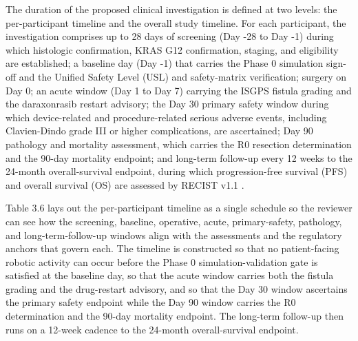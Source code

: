 The duration of the proposed clinical investigation is defined at two levels: the
per-participant timeline and the overall study timeline. For each participant, the
investigation comprises up to 28 days of screening (Day -28 to Day -1) during which
histologic confirmation, KRAS G12 confirmation, staging, and eligibility are
established; a baseline day (Day -1) that carries the Phase 0 simulation sign-off
and the Unified Safety Level (USL) and safety-matrix verification; surgery on Day 0;
an acute window (Day 1 to Day 7) carrying the ISGPS fistula grading and the
daraxonrasib restart advisory; the Day 30 primary safety window during which
device-related and procedure-related serious adverse events, including Clavien-Dindo
grade III or higher complications, are ascertained; Day 90 pathology and mortality
assessment, which carries the R0 resection determination and the 90-day mortality
endpoint; and long-term follow-up every 12 weeks to the 24-month overall-survival
endpoint, during which progression-free survival (PFS) and overall survival (OS)
are assessed by RECIST v1.1 \cite{daraxwhipple}.

Table 3.6 lays out the per-participant timeline as a single schedule so the
reviewer can see how the screening, baseline, operative, acute, primary-safety,
pathology, and long-term-follow-up windows align with the assessments and the
regulatory anchors that govern each. The timeline is constructed so that no
patient-facing robotic activity can occur before the Phase 0 simulation-validation
gate is satisfied at the baseline day, so that the acute window carries both the
fistula grading and the drug-restart advisory, and so that the Day 30 window
ascertains the primary safety endpoint while the Day 90 window carries the R0
determination and the 90-day mortality endpoint. The long-term follow-up then runs
on a 12-week cadence to the 24-month overall-survival endpoint.

